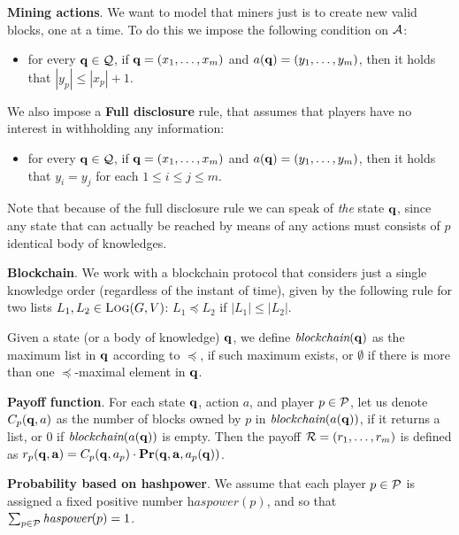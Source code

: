 \documentclass{article}
\begin{document}
\medskip
\noindent
\textbf{Mining actions}. We want to model that miners just  
is to create new valid blocks, one at a time. To do this we impose the following condition on $\mathcal{A}$: 
\begin{itemize}
\item for every $\mathbf{q} \in \mathcal{Q}$, if $\mathbf{q} = (x_1, \ldots, x_m)$ and $a(\mathbf{q}) = (y_1, \ldots, y_m)$, then it holds that $|y_p| \leq |x_p| + 1$.
\end{itemize}

We also impose a \textbf{Full disclosure} rule, that assumes that players have no interest in withholding any information: 
\begin{itemize}
\item for every $\mathbf{q} \in \mathcal{Q}$, if $\mathbf{q} = (x_1, \ldots, x_m)$ and $a(\mathbf{q}) = (y_1, \ldots, y_m)$, then it holds that $y_i = y_j$ for each $1 \leq i \leq j \leq m$.
\end{itemize} 

Note that because of the full disclosure rule we can speak of \emph{the} state $\mathbf{q}$, since any state that can actually be reached by means of 
any actions must consists of $p$ identical body of knowledges. 


\medskip
\noindent
\textbf{Blockchain}. We work with a blockchain protocol that considers just a single knowledge order (regardless of the instant of time), 
given by the following rule for two lists $L_1, L_2 \in \text{\sc Log}(G,V)$: $L_1 \preceq L_2$ if $|L_1| \leq |L_2|$. 

\newcommand{\blockchain}{\textit{blockchain}}
\newcommand{\hashpower}{\textit{haspower}}

Given a state (or a body of knowledge) $\mathbf{q}$, we define $\blockchain(\bq)$ as the maximum list in $\mathbf{q}$ according to $\preceq$, if 
such maximum exists, or $\emptyset$ if there is more than one $\preceq$-maximal element in $\mathbf{q}$. 


\medskip
\noindent
\textbf{Payoff function}. For each state $\mathbf{q}$, action $a$, and player $p \in \mathcal{P}$, let us denote $C_p(\mathbf{q},a)$ 
as the number of blocks owned by $p$ in $\blockchain(a(\bq))$, if it returns a list, or $0$ if $\blockchain(a(\bq))$ is empty. 
Then the payoff $\mathcal{R} = (r_1, \ldots, r_m)$ is defined as $r_p(\mathbf{q}, \mathbf{a}) = C_p(\mathbf{q}, a_p) \cdot \mathbf{Pr}(\mathbf{q}, \mathbf{a}, a_p(\mathbf{q}))$.

\medskip
\noindent
\textbf{Probability based on hashpower}. We assume that each player $p \in \mathcal{P}$ is assigned a fixed positive number $\hashpower(p)$, 
and so that $\sum_{p \in \cP} \hashpower(p) = 1$. 
\end{document}

